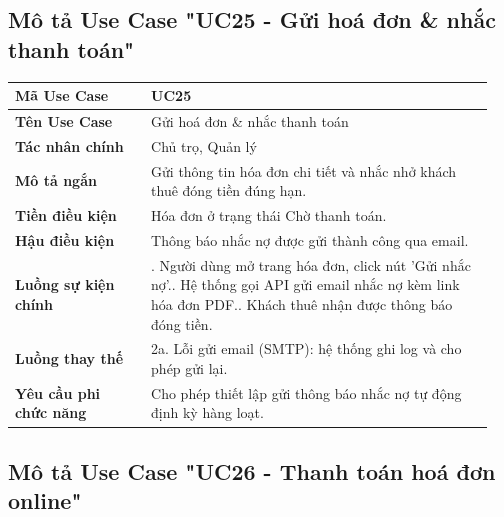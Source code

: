 \documentclass[a4paper,oneside]{report}
\begin{document}
\subsection{Mô tả Use Case "UC25 - Gửi hoá đơn \& nhắc thanh toán"}

\begin{longtable}[]{@{}>{\RaggedRight\arraybackslash}p{0.27\linewidth}>{\RaggedRight\arraybackslash}p{0.68\linewidth}@{}}
\toprule
\textbf{Mã Use Case} & UC25\tabularnewline
\midrule
\endhead
\textbf{Tên Use Case} & Gửi hoá đơn \& nhắc thanh toán\tabularnewline
\textbf{Tác nhân chính} & Chủ trọ, Quản lý\tabularnewline
\textbf{Mô tả ngắn} & Gửi thông tin hóa đơn chi tiết và nhắc nhở khách
thuê đóng tiền đúng hạn.\tabularnewline
\textbf{Tiền điều kiện} & Hóa đơn ở trạng thái Chờ thanh
toán.\tabularnewline
\textbf{Hậu điều kiện} & Thông báo nhắc nợ được gửi thành công qua
email.\tabularnewline
\textbf{Luồng sự kiện chính} & 1. Người dùng mở trang
hóa đơn, click nút 'Gửi nhắc nợ'.\newline 2. Hệ thống gọi API gửi
email nhắc nợ kèm link hóa đơn PDF.\newline 3. Khách thuê nhận được
thông báo đóng tiền.\tabularnewline
\textbf{Luồng thay thế} & 2a. Lỗi gửi email (SMTP): hệ thống ghi log và
cho phép gửi lại.\tabularnewline
\textbf{Yêu cầu phi chức năng} & Cho phép thiết lập gửi thông báo nhắc
nợ tự động định kỳ hàng loạt.\tabularnewline
\bottomrule
\end{longtable}

\subsection{Mô tả Use Case "UC26 - Thanh toán hoá đơn online"}
\end{document}
